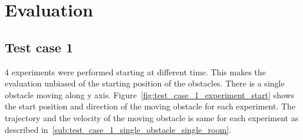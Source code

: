 
\chapter{Evaluation}
\newpage{}
\section{Test case 1}%
\label{sec:test_case_1}

4 experiments were performed starting at different time. This makes the evaluation unbiased of
the starting position of the obstacles. There is a single obstacle moving along y axis.  
Figure~\ref{fig:test_case_1_experiment_start} shows the start position and direction of the moving
obstacle for each experiment. The trajectory and the velocity of the moving obstacle is same for each
experiment as described in~\ref{sub:test_case_1_single_obstacle_single_room}.

